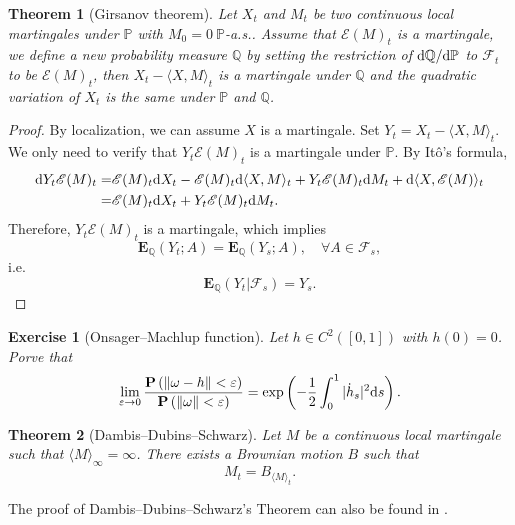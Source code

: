 \documentclass[twoside, 12pt]{book}
\numberwithin{equation}{chapter}
\newtheorem{theorem}{Theorem}[section]
\newtheorem{exercise}{Exercise}[section]
\def\cF{{\mathcal F}}
\def\mP{{\mathbb P}}
\def\mQ{{\mathbb Q}}
\def\bE{{\mathbf E}}
\def\bP{{\mathbf P}}
\def\sE{{\mathscr E}}
\def\l{\left}
\def\r{\right}
\def\<{\langle}
\def\>{\rangle}
\def\d{\text{\rm{d}}}
\def\eps{\varepsilon}
\begin{document}
	\begin{theorem}[Girsanov theorem]
		Let $X_t$ and $M_t$ be two continuous local martingales under $\mP$ with $M_0=0 ~  \mP$-a.s..  Assume that $\sE(M)_t$ is a martingale, we define a new probability measure $\mQ$ by setting the restriction of $\d\mQ/\d\mP$ to $\cF_t$ to be $\sE(M)_t$, then $X_t-\langle X, M \rangle_t$ is a martingale under $\mQ$ and the quadratic variation of $X_t$ is the same under $\mP$ and $\mQ$. 
	\end{theorem}
	\begin{proof}
		By localization, we can assume $X$ is a martingale. Set $Y_t=X_t-\<X,M\>_t$. We only need to verify that $Y_t\sE(M)_t$ is a martingale under $\mP$. By Itô's formula, 
		\[
		  \begin{aligned}
		  	\d Y_t \sE(M)_t=& \sE(M)_t \d X_t- \sE(M)_t \d \<X,M\>_t+ Y_t \sE(M)_t \d M_t+ \d \<X, \sE(M)\>_t \\
		  	=& \sE(M)_t \d X_t+ Y_t \sE(M)_t \d M_t. 
		  \end{aligned}
		\]
		Therefore, $Y_t\sE(M)_t$ is a martingale, which implies 
		$$
		    \bE_{\mQ} (Y_t; A) = \bE_{\mQ} (Y_s; A), \quad \forall A\in \cF_s, 
		$$
		i.e. 
		\[
		    \bE_{\mQ}(Y_t|\cF_s)= Y_s. 
		\]
	\end{proof}
	
	 \begin{exercise}[Onsager–Machlup function]
		Let $h\in C^2([0,1])$ with $h(0)=0$. Porve that 
		\[
		\lim_{\eps\to0}\frac{\bP\l( \|\omega-h\|<\eps\r)}{\bP\l(\|\omega\|<\eps \r)} = \exp \l(-\frac{1}{2}\int_0^1 |\dot h_s|^2 \d s \r). 
		\]
	\end{exercise}
	
	\begin{theorem}[Dambis–Dubins–Schwarz]\label{thm:DDS}
		Let $M$ be a continuous local martingale such that $\<M\>_\infty=\infty$. There exists a Brownian motion $B$ such that 
		$$
		    M_t=B_{\<M\>_t}. 
		$$
	\end{theorem}
    The proof of Dambis–Dubins–Schwarz's Theorem can also be found in \cite{Huang}. 
\end{document}
